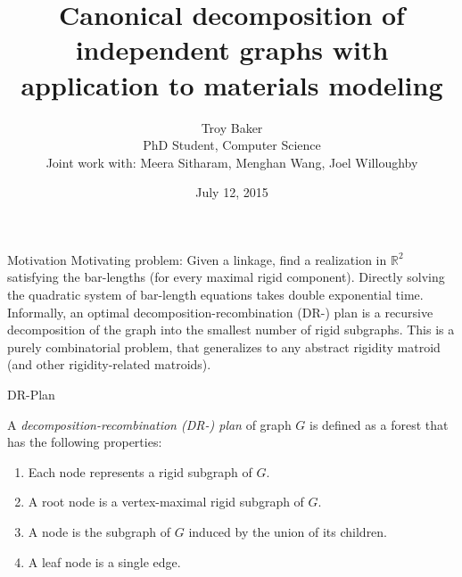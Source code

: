 \documentclass{beamer}
\title[Canonical\\Decomposition]{Canonical decomposition of independent graphs with application to materials modeling}
\author[Troy Baker]{Troy Baker\\
PhD Student, Computer Science\\
\n
\footnotesize Joint work\footfullcite{baker2015arxiv} with: Meera Sitharam, Menghan Wang, Joel Willoughby}
\institute{University of Florida}
\date{July 12, 2015}
\newcommand{\dfn}[1]{\alert{\textit{#1}}} %
\def\RR{\mathbb{R}}
\begin{document}


\begin{frame}
    \titlepage
\end{frame}


\begin{frame}{Motivation}
    Motivating problem: Given a linkage, find a realization in $\RR^2$ satisfying the bar-lengths (for every maximal rigid component).
\n
    Directly solving the quadratic system of bar-length equations takes \alert{double exponential time}.
\n
    Informally, an \alert{optimal decomposition-recombination (DR-) plan} is a \alert{recursive} decomposition of the graph
    into the smallest number of rigid subgraphs.
\n
    This is a \alert{purely combinatorial problem}, that generalizes to any abstract rigidity matroid (and other rigidity-related matroids).
\end{frame}

\begin{frame}{DR-Plan}
    \begin{definition}
        A \dfn{decomposition-recombination \mbox{(DR-)} plan}  of graph $G$ is defined as a forest that has the following properties:
        \begin{enumerate}
            \item Each node represents a rigid subgraph of $G$.
            \item A root node is a vertex-maximal rigid subgraph of $G$.
            \item A node is the subgraph of $G$ induced by the union of its children.
            \item A leaf node is a single edge.
        \end{enumerate}
    \end{definition}
\end{frame}
\end{document}
